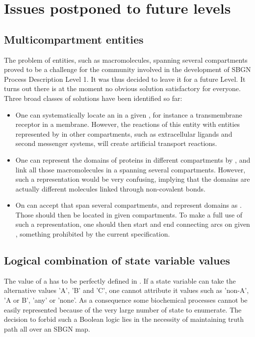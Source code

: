 \chapter{Issues postponed to future levels}\label{sec:postponed}

\section{Multicompartment entities}
\label{sec: unresolved multi-comp ents}

The problem of entities, such as macromolecules, spanning several compartments proved to be a challenge for the community involved in the development of SBGN Process Description Level 1. It was thus decided to leave it for a future Level. It turns out there is at the moment no obvious solution satisfactory for everyone. Three broad classes of solutions have been identified so far:

\begin{itemize}
\item One can systematically locate an  in a given , for instance a transmembrane receptor in a membrane. However, the reactions of this entity with entities represented by  in other compartments, such as extracellular ligands and second messenger systems, will create artificial transport reactions.
\item One can represent the domains of proteins in different compartments by , and link all those macromolecules in a  spanning several compartments. However, such a representation would be very confusing, implying that the domains are actually different molecules linked through non-covalent bonds.
\item On can accept  that span several compartments, and represent domains as . Those  should then be located in given compartments. To make a full use of such a representation, one should then start and end connecting arcs on given , something prohibited by the current specification.
\end{itemize}

\section{Logical combination of state variable values}

The value of a  has to be perfectly defined in \SBGNPDLone. If a state variable can take the alternative values 'A', 'B' and 'C',  one cannot attribute it values such as 'non-A', 'A or B', 'any' or 'none'. As a consequence some biochemical processes cannot be easily represented because of the very large number of state to enumerate. The decision to forbid such a Boolean logic lies in the necessity of maintaining truth path all over an SBGN map. 


